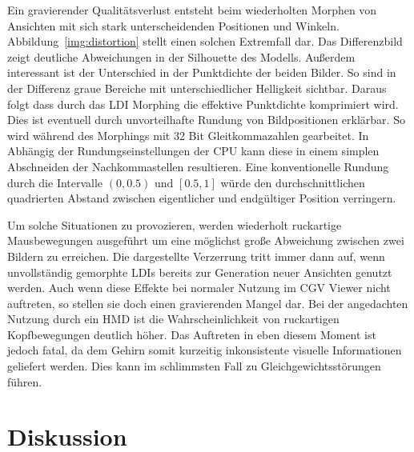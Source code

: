 \documentclass[hyperref, beleg, german]{cgvpub}
\begin{document}
Ein gravierender Qualitätsverlust entsteht beim wiederholten Morphen von
Ansichten mit sich stark unterscheidenden Positionen und Winkeln.
Abbildung~\ref{img:distortion} stellt einen solchen Extremfall dar. Das
Differenzbild zeigt deutliche Abweichungen in der Silhouette des Modells.
Außerdem interessant ist der Unterschied in der Punktdichte der beiden Bilder.
So sind in der Differenz graue Bereiche mit unterschiedlicher Helligkeit
sichtbar. Daraus folgt dass durch das LDI Morphing die effektive Punktdichte
komprimiert wird. Dies ist eventuell durch unvorteilhafte Rundung von
Bildpositionen erklärbar. So wird während des Morphings mit 32 Bit
Gleitkommazahlen gearbeitet. In Abhängig der Rundungseinstellungen der CPU kann
diese in einem simplen Abschneiden der Nachkommastellen resultieren. Eine
konventionelle Rundung durch die Intervalle \( \left(0, 0.5\right) \) und \(
\left[0.5, 1\right] \) würde den durchschnittlichen quadrierten Abstand zwischen
eigentlicher und endgültiger Position verringern.

Um solche Situationen zu provozieren, werden wiederholt
ruckartige Mausbewegungen ausgeführt um eine möglichst große Abweichung
zwischen zwei Bildern zu erreichen. Die dargestellte Verzerrung tritt immer
dann auf, wenn unvollständig gemorphte LDIs bereits zur Generation neuer
Ansichten genutzt werden. Auch wenn diese Effekte bei normaler Nutzung im CGV
Viewer nicht auftreten, so stellen sie doch einen gravierenden Mangel dar. Bei
der angedachten Nutzung durch ein HMD ist die Wahrscheinlichkeit von
ruckartigen Kopfbewegungen deutlich höher. Das Auftreten in eben diesem Moment
ist jedoch fatal, da dem Gehirn somit kurzeitig inkonsistente visuelle
Informationen geliefert werden. Dies kann im schlimmsten Fall zu
Gleichgewichtsstörungen führen.

\section{Diskussion}%
\label{sec:discussion}
\end{document}

